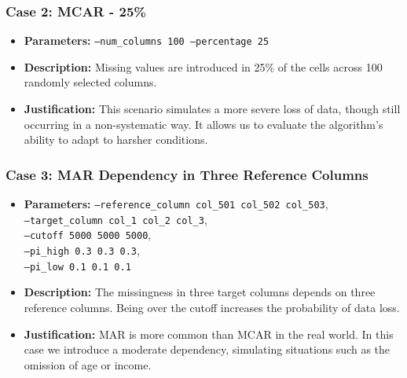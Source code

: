 \documentclass[a4paper,12pt]{article}
\begin{document}
\subsubsection{Case 2: MCAR - 25\%}
\begin{itemize}
    \item \textbf{Parameters:} \texttt{--num\_columns 100 --percentage 25}
    \item \textbf{Description:} Missing values are introduced in 25\% of the cells across 100 randomly selected columns.
    \item \textbf{Justification:} This scenario simulates a more severe loss of data, though still occurring in a non-systematic way. It allows us to evaluate the algorithm's ability to adapt to harsher conditions.
\end{itemize}

\subsubsection{Case 3: MAR Dependency in Three Reference Columns}
\begin{itemize}
    \item \textbf{Parameters:} \texttt{--reference\_column col\_501 col\_502 col\_503},\\
    \texttt{--target\_column col\_1 col\_2 col\_3},\\
    \texttt{--cutoff 5000 5000 5000},\\
    \texttt{--pi\_high 0.3 0.3 0.3},\\
    \texttt{--pi\_low 0.1 0.1 0.1}
    
    \item \textbf{Description:} The missingness in three target columns depends on three reference columns. Being over the cutoff increases the probability of data loss.
    \item \textbf{Justification:} MAR is more common than MCAR in the real world. In this case we introduce a moderate dependency, simulating situations such as the omission of age or income.  
\end{itemize}
\end{document}
